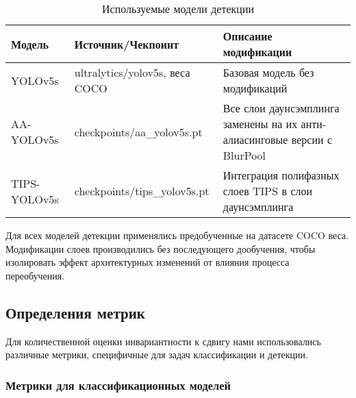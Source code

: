 \begin{table}[ht]
\centering
\caption{Используемые модели детекции}
\label{tab:detection_models}
\begin{tabular}{|p{3cm}|p{4cm}|p{6cm}|}
\hline
\textbf{Модель} & \textbf{Источник/Чекпоинт} & \textbf{Описание модификации} \\ \hline
YOLOv5s & ultralytics/yolov5s, веса COCO & Базовая модель без модификаций \\ \hline
AA-YOLOv5s & checkpoints/aa\_yolov5s.pt & Все слои даунсэмплинга заменены на их анти-алиасинговые версии с BlurPool \\ \hline
TIPS-YOLOv5s & checkpoints/tips\_yolov5s.pt & Интеграция полифазных слоев TIPS в слои даунсэмплинга \\ \hline
\end{tabular}
\end{table}

Для всех моделей детекции применялись предобученные на датасете COCO веса. Модификации слоев производились без последующего дообучения, чтобы изолировать эффект архитектурных изменений от влияния процесса переобучения.

\subsection{Определения метрик}
\label{experiments:setup:metrics}

Для количественной оценки инвариантности к сдвигу нами использовались различные метрики, специфичные для задач классификации и детекции.

\subsubsection{Метрики для классификационных моделей}
\label{experiments:setup:metrics:classification}

